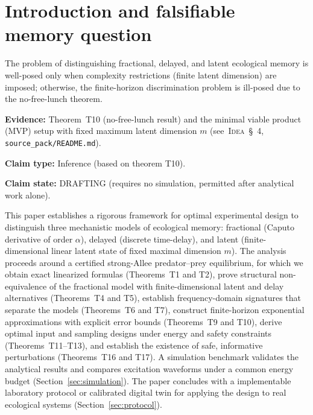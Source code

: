\section{Introduction and falsifiable memory question}

The problem of distinguishing fractional, delayed, and latent ecological memory is well-posed only when complexity restrictions (finite latent dimension) are imposed; otherwise, the finite-horizon discrimination problem is ill-posed due to the no-free-lunch theorem.

\textbf{Evidence:} Theorem~T10 (no-free-lunch result) and the minimal viable product (MVP) setup with fixed maximum latent dimension \(m\) (see~\textsc{Idea}~\S~4, \texttt{source\_pack/README.md}).

\textbf{Claim type:} Inference (based on theorem T10).

\textbf{Claim state:} DRAFTING (requires no simulation, permitted after analytical work alone).

This paper establishes a rigorous framework for optimal experimental design to distinguish three mechanistic models of ecological memory: fractional (Caputo derivative of order \(\alpha\)), delayed (discrete time-delay), and latent (finite-dimensional linear latent state of fixed maximal dimension \(m\)).  The analysis proceeds around a certified strong-Allee predator--prey equilibrium, for which we obtain exact linearized formulas (Theorems~T1 and T2), prove structural non-equivalence of the fractional model with finite-dimensional latent and delay alternatives (Theorems~T4 and T5), establish frequency-domain signatures that separate the models (Theorems~T6 and T7), construct finite-horizon exponential approximations with explicit error bounds (Theorems~T9 and T10), derive optimal input and sampling designs under energy and safety constraints (Theorems~T11--T13), and establish the existence of safe, informative perturbations (Theorems~T16 and T17).  A simulation benchmark validates the analytical results and compares excitation waveforms under a common energy budget (Section~\ref{sec:simulation}).  The paper concludes with a implementable laboratory protocol or calibrated digital twin for applying the design to real ecological systems (Section~\ref{sec:protocol}).
